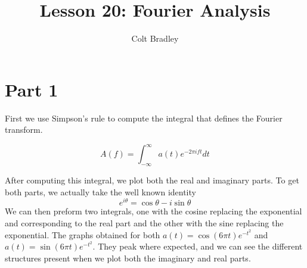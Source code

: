 \documentclass[11pt]{article}
\begin{document}
\title{Lesson 20: Fourier Analysis}
\author{Colt Bradley}
\date{}
\maketitle

\section{Part 1}

First we use Simpson's rule to compute the integral that defines the Fourier transform. 

\begin{equation}
A(f) = \int_{-\infty}^{\infty} a(t) e^{-2 \pi i f t}dt
\end{equation}

After computing this integral, we plot both the real and imaginary parts. To get both parts, we actually take the well known identity 
\begin{equation}
e^{i \theta} = \cos \theta - i\sin \theta
\end{equation}
We can then preform two integrals, one with the cosine replacing the exponential and corresponding to the real part and the other with the sine replacing the exponential. The graphs obtained for both $a(t) = \cos (6 \pi t) e^{-t^2}$ and $a(t) = \sin (6 \pi t) e^{-t^2}$. They peak where expected, and we can see the different structures present when we plot both the imaginary and real parts. 
\end{document}
